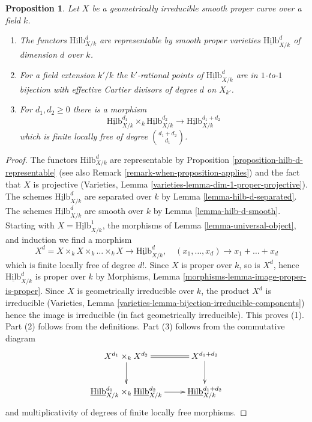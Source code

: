 \documentclass[10pt,a4paper]{amsart}
\theoremstyle{plain}
\newtheorem{proposition}[subsection]{Proposition}
\theoremstyle{definition}
\theoremstyle{remark}
\numberwithin{equation}{subsection}
\def\Hilbfunctor{\mathrm{Hilb}}
\begin{document}
\begin{proposition}
\label{proposition-hilb-d}
Let $X$ be a geometrically irreducible smooth proper curve over a field $k$.
\begin{enumerate}
\item The functors $\Hilbfunctor^d_{X/k}$ are representable by smooth
proper varieties $\underline{\Hilbfunctor}^d_{X/k}$ of dimension
$d$ over $k$.
\item For a field extension $k'/k$ the $k'$-rational points
of $\underline{\Hilbfunctor}^d_{X/k}$ are in $1$-to-$1$ bijection
with effective Cartier divisors of degree $d$ on $X_{k'}$.
\item For $d_1, d_2 \geq 0$ there is a morphism
$$
\underline{\Hilbfunctor}^{d_1}_{X/k}
\times_k
\underline{\Hilbfunctor}^{d_2}_{X/k}
\longrightarrow
\underline{\Hilbfunctor}^{d_1 + d_2}_{X/k}
$$
which is finite locally free of degree ${d_1 + d_2 \choose d_1}$.
\end{enumerate}
\end{proposition}

\begin{proof}
The functors $\Hilbfunctor^d_{X/k}$ are representable by
Proposition \ref{proposition-hilb-d-representable}
(see also Remark \ref{remark-when-proposition-applies})
and the fact that $X$ is projective
(Varieties, Lemma \ref{varieties-lemma-dim-1-proper-projective}).
The schemes $\underline{\Hilbfunctor}^d_{X/k}$ are separated
over $k$ by Lemma \ref{lemma-hilb-d-separated}.
The schemes $\underline{\Hilbfunctor}^d_{X/k}$ are smooth
over $k$ by Lemma \ref{lemma-hilb-d-smooth}.
Starting with $X = \underline{\Hilbfunctor}^1_{X/k}$,
the morphisms of Lemma \ref{lemma-universal-object},
and induction we find a morphism
$$
X^d = X \times_k X \times_k \ldots \times_k X \longrightarrow
\underline{\Hilbfunctor}^d_{X/k},\quad
(x_1, \ldots, x_d) \longrightarrow x_1 + \ldots + x_d
$$
which is finite locally free of degree $d!$. Since $X$ is
proper over $k$, so is $X^d$, hence
$\underline{\Hilbfunctor}^d_{X/k}$ is proper over $k$ by
Morphisms, Lemma \ref{morphisms-lemma-image-proper-is-proper}.
Since $X$ is geometrically irreducible over $k$, the product
$X^d$ is irreducible
(Varieties, Lemma \ref{varieties-lemma-bijection-irreducible-components})
hence the image is irreducible (in fact geometrically irreducible).
This proves (1). Part (2) follows from the definitions. Part (3) follows
from the commutative diagram
$$
\xymatrix{
X^{d_1} \times_k X^{d_2} \ar[d] \ar@{=}[r] & X^{d_1 + d_2} \ar[d] \\
\underline{\Hilbfunctor}^{d_1}_{X/k}
\times_k
\underline{\Hilbfunctor}^{d_2}_{X/k}
\ar[r] &
\underline{\Hilbfunctor}^{d_1 + d_2}_{X/k}
}
$$
and multiplicativity of degrees of finite locally free morphisms.
\end{proof}
\end{document}
